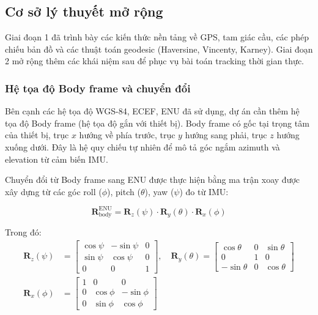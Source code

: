 \subsection{Cơ sở lý thuyết mở rộng}

\hspace{0.5cm} Giai đoạn 1 đã trình bày các kiến thức nền tảng về GPS, tam giác cầu, các phép chiếu bản đồ và các thuật toán geodesic (Haversine, Vincenty, Karney). Giai đoạn 2 mở rộng thêm các khái niệm sau để phục vụ bài toán tracking thời gian thực.

\subsubsection{Hệ tọa độ Body frame và chuyển đổi}

\hspace{0.5cm} Bên cạnh các hệ tọa độ WGS-84, ECEF, ENU đã sử dụng, dự án cần thêm hệ tọa độ Body frame (hệ tọa độ gắn với thiết bị). Body frame có gốc tại trọng tâm của thiết bị, trục $x$ hướng về phía trước, trục $y$ hướng sang phải, trục $z$ hướng xuống dưới. Đây là hệ quy chiếu tự nhiên để mô tả góc ngắm azimuth và elevation từ cảm biến IMU.

Chuyển đổi từ Body frame sang ENU được thực hiện bằng ma trận xoay được xây dựng từ các góc roll ($\phi$), pitch ($\theta$), yaw ($\psi$) đo từ IMU:

\begin{equation}
\mathbf{R}_{\text{body}}^{\text{ENU}} = \mathbf{R}_z(\psi) \cdot \mathbf{R}_y(\theta) \cdot \mathbf{R}_x(\phi)
\end{equation}

Trong đó:
\begin{align}
\mathbf{R}_z(\psi) &= \begin{bmatrix} \cos\psi & -\sin\psi & 0 \\ \sin\psi & \cos\psi & 0 \\ 0 & 0 & 1 \end{bmatrix}, \quad
\mathbf{R}_y(\theta) = \begin{bmatrix} \cos\theta & 0 & \sin\theta \\ 0 & 1 & 0 \\ -\sin\theta & 0 & \cos\theta \end{bmatrix} \\
\mathbf{R}_x(\phi) &= \begin{bmatrix} 1 & 0 & 0 \\ 0 & \cos\phi & -\sin\phi \\ 0 & \sin\phi & \cos\phi \end{bmatrix}
\end{align}

